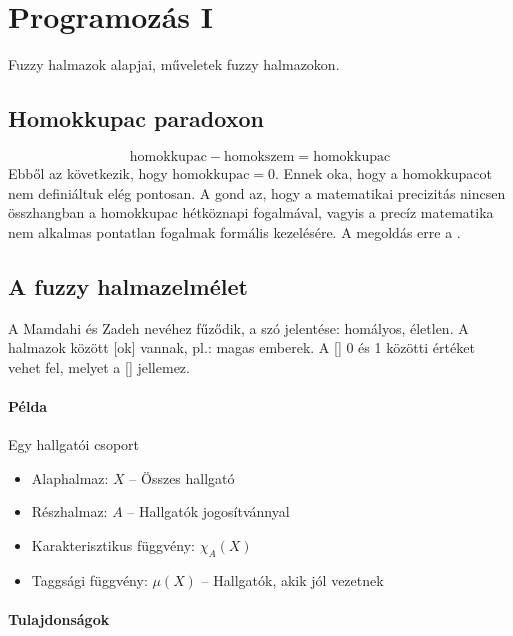 \documentclass[../../main.tex]{subfiles}
\begin{document}
\newpage

\section{Programozás I}

\begin{fulltheorem}
  Fuzzy halmazok alapjai, műveletek fuzzy halmazokon.
\end{fulltheorem}

\subsection{Homokkupac paradoxon}
\[
  \mathrm{homokkupac - homokszem = homokkupac}
\]
Ebből az következik, hogy $\mathrm{homokkupac} = 0$.
Ennek oka, hogy a homokkupacot nem definiáltuk elég pontosan.
A gond az, hogy a matematikai precizitás nincsen összhangban a homokkupac
hétköznapi fogalmával, vagyis a precíz matematika nem alkalmas pontatlan
fogalmak formális kezelésére. A megoldás erre a .

\subsection{A fuzzy halmazelmélet}

A  Mamdahi és Zadeh nevéhez fűződik, a szó jelentése:
homályos, életlen. A halmazok között [ok] vannak, pl.:
magas emberek. A [] 0 és 1 közötti értéket vehet fel,
melyet a [] jellemez.

\paragraph{Példa} Egy hallgatói csoport
\begin{itemize}
  \item Alaphalmaz: $X$ -- Összes hallgató
  \item Részhalmaz: $A$ -- Hallgatók jogosítvánnyal
  \item Karakterisztikus függvény: $\chi_A(X)$
  \item Taggsági függvény: $\mu(X)$ -- Hallgatók, akik jól vezetnek
\end{itemize}

\paragraph{Tulajdonságok}
\end{document}
